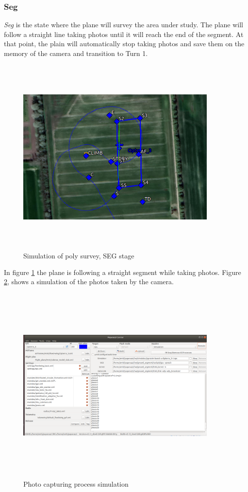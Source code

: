 \subsubsection{Seg}
\textit{Seg} is the state where the plane will survey the area under study. The plane will follow a straight line taking photos until it will reach the end of the segment. At that point, the plain will automatically stop taking photos and save them on the memory of the camera and transition to Turn 1.
\begin{figure}[H]
\centering
\includegraphics[width=10cm,height=10cm,keepaspectratio]{imagenes/SEG.png}
\caption{Simulation of poly survey, SEG stage}
\label{fig:SEG_stage}
\end{figure}

In figure \ref{fig:SEG_stage} the plane is following a straight segment while taking photos. Figure \ref{fig:Photos}, shows a simulation of the photos taken by the camera.
\begin{figure}[H]
\centering
\includegraphics[width=10cm,height=10cm,keepaspectratio]{imagenes/Photos.png}
\caption{Photo capturing process simulation}
\label{fig:Photos}
\end{figure}